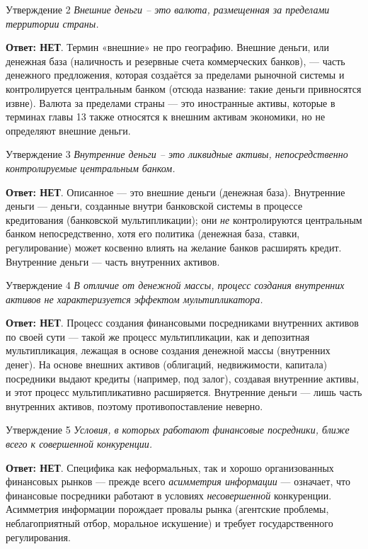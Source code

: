\documentclass[10pt,a4paper]{article}
\newcommand{\qnet}{\textbf{\color{nored}Ответ: НЕТ}}
\newenvironment{answer}[2]{%
  \begin{qbox}{Утверждение #1}
  \textit{#2}\par\smallskip
}{%
  \end{qbox}\vspace{2pt}
}
\begin{document}
\begin{answer}{2}{Внешние деньги -- это валюта, размещенная за пределами территории страны.}
\qnet. Термин «внешние» не про географию. Внешние деньги, или денежная база (наличность и резервные счета коммерческих банков), --- часть денежного предложения, которая создаётся за пределами рыночной системы и контролируется центральным банком (отсюда название: такие деньги привносятся извне). Валюта за пределами страны --- это иностранные активы, которые в терминах главы 13 также относятся к внешним активам экономики, но не определяют внешние деньги.
\end{answer}

\begin{answer}{3}{Внутренние деньги -- это ликвидные активы, непосредственно контролируемые центральным банком.}
\qnet. Описанное --- это внешние деньги (денежная база). Внутренние деньги --- деньги, созданные внутри банковской системы в процессе кредитования (банковской мультипликации); они \emph{не} контролируются центральным банком непосредственно, хотя его политика (денежная база, ставки, регулирование) может косвенно влиять на желание банков расширять кредит. Внутренние деньги --- часть внутренних активов.
\end{answer}

\begin{answer}{4}{В отличие от денежной массы, процесс создания внутренних активов не характеризуется эффектом мультипликатора.}
\qnet. Процесс создания финансовыми посредниками внутренних активов по своей сути --- такой же процесс мультипликации, как и депозитная мультипликация, лежащая в основе создания денежной массы (внутренних денег). На основе внешних активов (облигаций, недвижимости, капитала) посредники выдают кредиты (например, под залог), создавая внутренние активы, и этот процесс мультипликативно расширяется. Внутренние деньги --- лишь часть внутренних активов, поэтому противопоставление неверно.
\end{answer}

\begin{answer}{5}{Условия, в которых работают финансовые посредники, ближе всего к совершенной конкуренции.}
\qnet. Специфика как неформальных, так и хорошо организованных финансовых рынков --- прежде всего \emph{асимметрия информации} --- означает, что финансовые посредники работают в условиях \emph{несовершенной} конкуренции. Асимметрия информации порождает провалы рынка (агентские проблемы, неблагоприятный отбор, моральное искушение) и требует государственного регулирования.
\end{answer}
\end{document}
